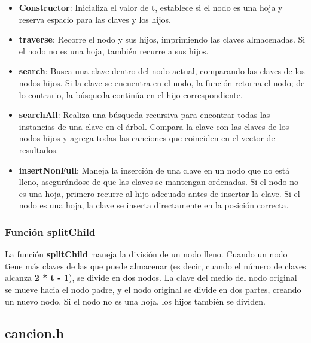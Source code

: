\documentclass[corference]{IEEEtran}
\begin{document}
\begin{flushleft}
                \begin{itemize}[left=4em]
                    \item \textbf{Constructor}: Inicializa el valor de \textbf{t}, establece si el nodo es una hoja y reserva espacio para las claves y los hijos.
                    \item \textbf{traverse}: Recorre el nodo y sus hijos, imprimiendo las claves almacenadas. Si el nodo no es una hoja, también recurre a sus hijos.
                    \item \textbf{search}: Busca una clave dentro del nodo actual, comparando las claves de los nodos hijos. Si la clave se encuentra en el nodo, la función retorna el nodo; de lo contrario, la búsqueda continúa en el hijo correspondiente.
                    \item \textbf{searchAll}: Realiza una búsqueda recursiva para encontrar todas las instancias de una clave en el árbol. Compara la clave con las claves de los nodos hijos y agrega todas las canciones que coinciden en el vector de resultados.
                    \item \textbf{insertNonFull}: Maneja la inserción de una clave en un nodo que no está lleno, asegurándose de que las claves se mantengan ordenadas. Si el nodo no es una hoja, primero recurre al hijo adecuado antes de insertar la clave. Si el nodo es una hoja, la clave se inserta directamente en la posición correcta.
                \end{itemize}
            
            \subsubsection{Función splitChild}
            
                \noindent\hspace*{4em}La función \textbf{splitChild} maneja la división de un nodo lleno. Cuando un nodo tiene más claves de las que puede almacenar (es decir, cuando el número de claves alcanza \textbf{2 * t - 1}), se divide en dos nodos. La clave del medio del nodo original se mueve hacia el nodo padre, y el nodo original se divide en dos partes, creando un nuevo nodo. Si el nodo no es una hoja, los hijos también se dividen.
            
            \subsection{cancion.h}


\end{flushleft}
\end{document}

